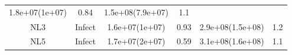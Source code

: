 \documentclass[]{article}
\begin{document}
\begin{longtable}[]{@{}cccccc@{}}
\begin{minipage}[t]{0.16\columnwidth}
1.8e+07(1e+07)
\strut\end{minipage} &
\begin{minipage}[t]{0.16\columnwidth}\centering\strut
0.84
\strut\end{minipage} &
\begin{minipage}[t]{0.17\columnwidth}\centering\strut
1.5e+08(7.9e+07)
\strut\end{minipage} &
\begin{minipage}[t]{0.12\columnwidth}\centering\strut
1.1
\strut\end{minipage}\tabularnewline
\begin{minipage}[t]{0.12\columnwidth}\centering\strut
NL3
\strut\end{minipage} &
\begin{minipage}[t]{0.12\columnwidth}\centering\strut
Infect
\strut\end{minipage} &
\begin{minipage}[t]{0.16\columnwidth}\centering\strut
1.6e+07(1e+07)
\strut\end{minipage} &
\begin{minipage}[t]{0.16\columnwidth}\centering\strut
0.93
\strut\end{minipage} &
\begin{minipage}[t]{0.17\columnwidth}\centering\strut
2.9e+08(1.5e+08)
\strut\end{minipage} &
\begin{minipage}[t]{0.12\columnwidth}\centering\strut
1.2
\strut\end{minipage}\tabularnewline
\begin{minipage}[t]{0.12\columnwidth}\centering\strut
NL5
\strut\end{minipage} &
\begin{minipage}[t]{0.12\columnwidth}\centering\strut
Infect
\strut\end{minipage} &
\begin{minipage}[t]{0.16\columnwidth}\centering\strut
1.7e+07(2e+07)
\strut\end{minipage} &
\begin{minipage}[t]{0.16\columnwidth}\centering\strut
0.59
\strut\end{minipage} &
\begin{minipage}[t]{0.17\columnwidth}\centering\strut
3.1e+08(1.6e+08)
\strut\end{minipage} &
\begin{minipage}[t]{0.12\columnwidth}\centering\strut
1.1
\strut\end{minipage}\tabularnewline

\end{longtable}
\end{document}
